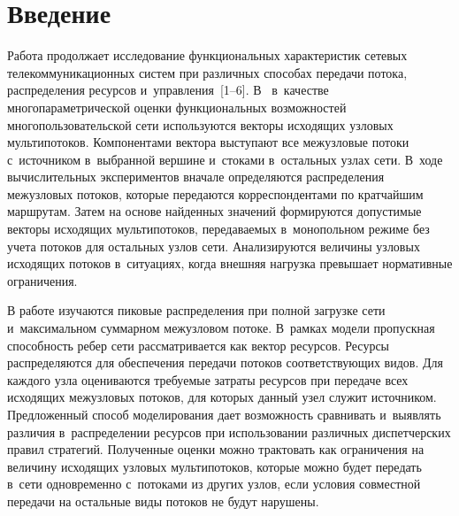 
  



\thispagestyle{headings}

\begin{multicols}{2}

\label{st\stat}


\section{Введение}

Работа продолжает исследование функциональных характеристик сетевых 
телекоммуникационных  систем при различных способах передачи потока, 
распределения ресурсов и~управ\-ле\-ния~[1--6]. В~\cite{Mal23-1, Mal23-3, Mal23-6} в~качестве 
многопараметрической оценки функциональных возможностей многопользовательской 
сети используются векторы исходящих узловых мультипотоков. Компонентами вектора 
выступают все межузловые потоки с~источником в~выбранной вершине и~стоками в~остальных узлах сети. В~ходе вычислительных экспериментов вначале определяются 
распределения  межузловых потоков, которые передаются корреспондентами по 
кратчайшим маршрутам. Затем на основе найденных значений  формируются допустимые 
векторы исходящих мультипотоков,  передаваемых в~монопольном режиме без учета 
потоков для остальных узлов сети. Анализируются  величины  узловых исходящих  
потоков в~ситуациях, когда внешняя нагрузка превышает нормативные ограничения.

В работе изучаются пиковые распределения при полной загрузке сети и~максимальном 
суммарном межузловом потоке. В~рамках  модели  пропускная способность  ребер 
сети рассматривается как вектор ресурсов. Ресурсы распределяются  для 
обеспечения  передачи потоков соответствующих видов.  Для каждого узла 
оцениваются требуемые  затраты ресурсов  при  передаче всех исходящих межузловых 
потоков, для которых  данный узел служит источником.   Предложенный способ  
моделирования дает возможность сравнивать и~выявлять различия в~распределении 
ресурсов при использовании  различных диспетчерских правил стратегий.  
Полученные  оценки можно трактовать как ограничения на величину исходящих 
узловых мультипотоков, которые можно будет передать в~сети одновременно с~потоками из других узлов, если  условия совместной передачи на остальные виды 
потоков не будут нарушены.


\end{multicols}
